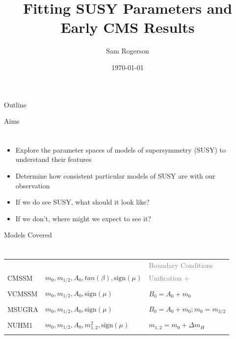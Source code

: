 \documentclass{beamer}
\begin{document}
\title{Fitting SUSY Parameters and Early CMS Results}
\author{Sam Rogerson}
\date{\today}

\begin{frame}[plain]
\titlepage
\end{frame}

\begin{frame}{Outline}
\tableofcontents
\end{frame}


\begin{frame}{Aims}
\section{\insertframetitle}
  \begin{itemize}
    \item Explore the parameter spaces of models of supersymmetry (SUSY) to
    understand their features
    \item Determine how consistent particular models of SUSY are with our
    observation
    \item If we do see SUSY, what should it look like? 
    \item If we don't, where might we expect to see it?
  \end{itemize} 
\end{frame}

\begin{frame}{Models Covered}
\section{\insertframetitle}
  \begin{tabular}{ l l l }
    & & \textcolor{gray}{Boundary Conditions}\\
    \alert{CMSSM}  & $m_{0},m_{1/2},A_{0},tan(\beta),\textrm{sign}(\mu)$  & 
    \textcolor{gray}{Unification + } \\ \\ 
    VCMSSM & $m_{0},m_{1/2},A_{0},\textrm{sign}(\mu)$ & $B_{0}=A_{0}+m_{0}$  \\
    \\
    \alert{MSUGRA} & $m_{0},m_{1/2},A_{0},\textrm{sign}(\mu)$ & $B_{0}=A_{0}+m_{0};
    m_{0}=m_{3/2}$  \\ \\
    NUHM1  & $m_{0},m_{1/2},A_{0},m_{1,2}^{2},\textrm{sign}(\mu)$ & $m_{1,2} =
    m_{0} + \Delta m_{H}$  \\ \\
  \end{tabular}
\end{frame}
\end{document}
